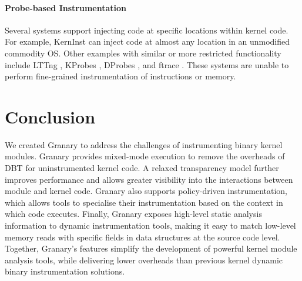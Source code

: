 \documentclass[preprint]{sigplanconf}
\begin{document}
\vspace{-3pt}\paragraph{Probe-based Instrumentation} Several systems support injecting code at specific locations within kernel code. For example, KernInst \cite{KernInst} can inject code at almost any location in an unmodified commodity OS. Other examples with similar or more restricted functionality include LTTng \cite{LTTng}, KProbes \cite{KProbes}, DProbes \cite{DProbes}, and ftrace \cite{ftrace}. These systems are unable to perform fine-grained instrumentation of instructions or memory.


\section{Conclusion}\label{sec:conclusion}
We created Granary to address the challenges of instrumenting binary kernel modules.  Granary provides mixed-mode execution to remove the overheads of DBT for uninstrumented kernel code.  A relaxed transparency model further improves performance and allows greater visibility into the interactions between module and kernel code.  Granary also supports policy-driven instrumentation, which allows tools to specialise their instrumentation based on the context in which code executes.  Finally, Granary exposes high-level static analysis information to dynamic instrumentation tools, making it easy to match low-level memory reads with specific fields in data structures at the source code level. 
Together, Granary's features simplify the development of powerful kernel module analysis tools, while delivering lower overheads than previous kernel dynamic binary instrumentation solutions.



\end{document}
